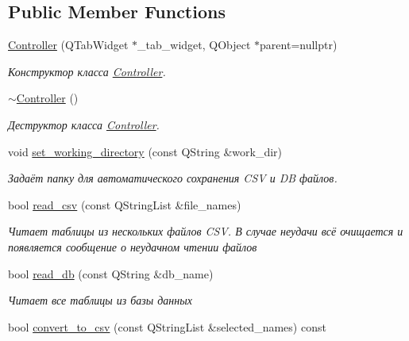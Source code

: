 \subsection*{Public Member Functions}
\begin{DoxyCompactItemize}
\item 
\mbox{\hyperlink{class_controller_a2911be3c6cf58c8525aa63d804488b6a}{Controller}} (Q\+Tab\+Widget $\ast$\+\_\+tab\+\_\+widget, Q\+Object $\ast$parent=nullptr)
\begin{DoxyCompactList}\small\item\em Конструктор класса \mbox{\hyperlink{class_controller}{Controller}}. \end{DoxyCompactList}\item 
\mbox{\label{class_controller_a0ab87934c4f7a266cfdb86e0f36bc1b5}} 
\mbox{\hyperlink{class_controller_a0ab87934c4f7a266cfdb86e0f36bc1b5}{$\sim$\+Controller}} ()
\begin{DoxyCompactList}\small\item\em Деструктор класса \mbox{\hyperlink{class_controller}{Controller}}. \end{DoxyCompactList}\item 
void \mbox{\hyperlink{class_controller_ae788a9a67cbce41929031afcda137b6a}{set\+\_\+working\+\_\+directory}} (const Q\+String \&work\+\_\+dir)
\begin{DoxyCompactList}\small\item\em Задаёт папку для автоматического сохранения C\+SV и DB файлов. \end{DoxyCompactList}\item 
bool \mbox{\hyperlink{class_controller_ada26f78fcec6b246700604b412622d7c}{read\+\_\+csv}} (const Q\+String\+List \&file\+\_\+names)
\begin{DoxyCompactList}\small\item\em Читает таблицы из нескольких файлов C\+SV. В случае неудачи всё очищается и появляется сообщение о неудачном чтении файлов \end{DoxyCompactList}\item 
bool \mbox{\hyperlink{class_controller_ae69865387ccd62da77649c705785c2bc}{read\+\_\+db}} (const Q\+String \&db\+\_\+name)
\begin{DoxyCompactList}\small\item\em Читает все таблицы из базы данных \end{DoxyCompactList}\item 
bool \mbox{\hyperlink{class_controller_a07bd206b7ca5fec8c3a6fb093ed9b307}{convert\+\_\+to\+\_\+csv}} (const Q\+String\+List \&selected\+\_\+names) const

\end{DoxyCompactItemize}
